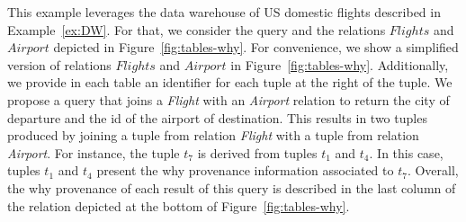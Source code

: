 \begin{example}
\label{ex:whyPROV}
This example leverages the data warehouse of US domestic flights described in Example~\ref{ex:DW}.
For that, we consider the query and the relations $Flights$ and $Airport$ depicted in Figure~\ref{fig:tables-why}. For convenience, we show a simplified version of relations $Flights$ and $Airport$ in Figure~\ref{fig:tables-why}. Additionally, we provide in each table an identifier for each tuple at the right of the tuple.
We propose a query that joins a \emph{Flight} with an \emph{Airport} relation to return the city of departure and the id of the airport of destination. This results in two tuples produced by joining a tuple from relation  \emph{Flight} with a tuple from relation \emph{Airport}. For instance, the tuple $t_7$ is derived from tuples $t_1$ and $t_4$. In this case, tuples $t_1$ and $t_4$ present the why provenance information associated to $t_7$.
Overall, the why provenance of each result of this query is described in the last column of the relation depicted at the bottom of Figure~\ref{fig:tables-why}.
\end{example}





